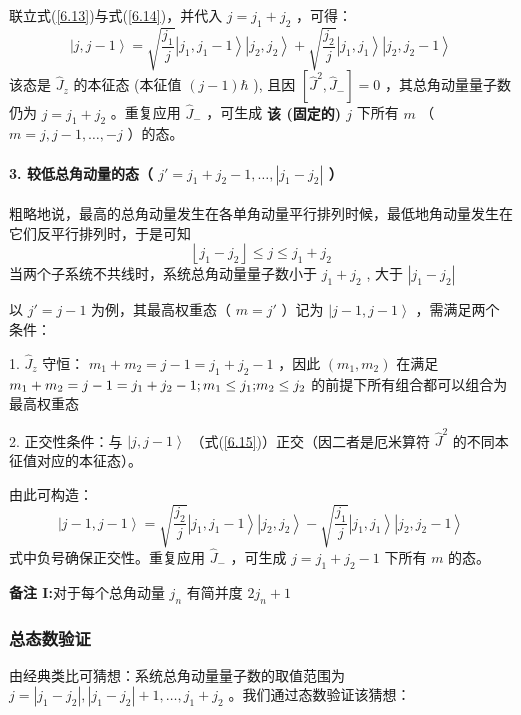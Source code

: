 联立式(\ref{6.13})与式(\ref{6.14})，并代入 \(j = j_1 + j_2\) ，可得：
\begin{equation}
	\left| j, j-1 \right> = \sqrt{\frac{j_1}{j}} \left| j_1, j_1-1 \right>\left| j_2, j_2 \right> + \sqrt{\frac{j_2}{j}} \left| j_1, j_1 \right>\left| j_2, j_2-1 \right> \label{6.15}
\end{equation}
该态是 \(\hat{J}_z\) 的本征态 (本征值 \((j-1)\hbar\) ), 且因 \([\hat{J}^2, \hat{J}_-] = 0\) ，其总角动量量子数仍为 \(j = j_1 + j_2\) 。重复应用 \(\hat{J}_-\) ，可生成 \textbf{该 (固定的)  \(j\) } 下所有 \(m\) （ \(m = j, j-1, \dots, -j\) ）的态。

\paragraph{3. 较低总角动量的态（ \(j' = j_1 + j_2 - 1, \dots, |j_1 - j_2|\) ）}
粗略地说，最高的总角动量发生在各单角动量平行排列时候，最低地角动量发生在它们反平行排列时，于是可知
\[
\left\lfloor {{j_1} - {j_2}} \right\rfloor  \le j \le {j_1} + {j_2}
\]
当两个子系统不共线时，系统总角动量量子数小于 \(j_1 + j_2\) , 大于  \(|j_1 - j_2|\) 

以 \(j'= j - 1\) 为例，其最高权重态（ \(m = j'\) ）记为 \(\left| j-1, j-1 \right>\) ，需满足两个条件：

1.  \(\hat{J}_z\) 守恒： \(m_1 + m_2 = j-1 = j_1 + j_2 - 1\) ，因此 \((m_1, m_2)\) 在满足  \(m_1 + m_2 = j-1 = j_1 + j_2 - 1;{m_1} \le {j_1}{\rm{; }}{m_2} \le {j_2}\)  的前提下所有组合都可以组合为最高权重态

2. 正交性条件：与 \(\left| j, j-1 \right>\) （式(\ref{6.15})）正交（因二者是厄米算符 \(\hat{J}^2\) 的不同本征值对应的本征态）。

由此可构造：
\begin{equation}
	\left| j-1, j-1 \right> = \sqrt{\frac{j_2}{j}} \left| j_1, j_1-1 \right>\left| j_2, j_2 \right> - \sqrt{\frac{j_1}{j}} \left| j_1, j_1 \right>\left| j_2, j_2-1 \right>
\end{equation}
式中负号确保正交性。重复应用 \(\hat{J}_-\) ，可生成 \(j = j_1 + j_2 - 1\) 下所有 \(m\) 的态。

\noindent \textbf{备注 I:}对于每个总角动量  \(j_n\)  有简并度  \(2j_n+1\) 

\subsubsection{总态数验证}
由经典类比可猜想：系统总角动量量子数的取值范围为 \(j = |j_1 - j_2|, |j_1 - j_2| + 1, \dots, j_1 + j_2\) 。我们通过态数验证该猜想：

